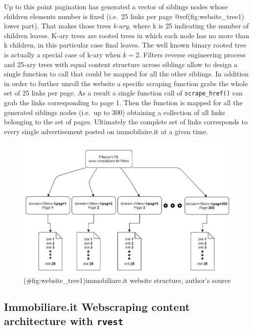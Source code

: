 \documentclass[
  12pt,
  a4paper,
  oneside]{book}
\theoremstyle{definition}
\theoremstyle{definition}
\theoremstyle{definition}
\theoremstyle{remark}
\begin{document}
Up to this point pagination has generated a vector of siblings nodes whose children elements number is fixed (i.e.~25 links per page @ref(fig:website\_tree1) lower part). That makes those trees \emph{k-ary}, where k is 25 indicating the number of children leaves. K-ary trees are rooted trees in which each node has no more than k children, in this particular case final leaves. The well known binary rooted tree is actually a special case of k-ary when \(k = 2\). Filters reverse engineering process and 25-ary trees with equal content structure across siblings allow to design a single function to call that could be mapped for all the other siblings. In addition in order to further unroll the website a specific scraping function grabs the whole set of 25 links per page. As a result a single function call of \texttt{scrape\_href()} can grab the links corresponding to page 1. Then the function is mapped for all the generated siblings nodes (i.e.~up to 300) obtaining a collection of all links belonging to the set of pages. Ultimately the complete set of links corresponds to every single advertisement posted on immobilaire.it at a given time.

\begin{figure}
\centering
\includegraphics{images/website_tree1.jpg}
\caption{(\#fig:website\_tree1)immobiliare.it website structure, author's source}
\end{figure}

\hypertarget{immobiliare.it-webscraping-content-architecture-with-rvest}{%
\subsection{\texorpdfstring{Immobiliare.it Webscraping content architecture with \texttt{rvest}}{Immobiliare.it Webscraping content architecture with rvest}}\label{immobiliare.it-webscraping-content-architecture-with-rvest}}
\end{document}
